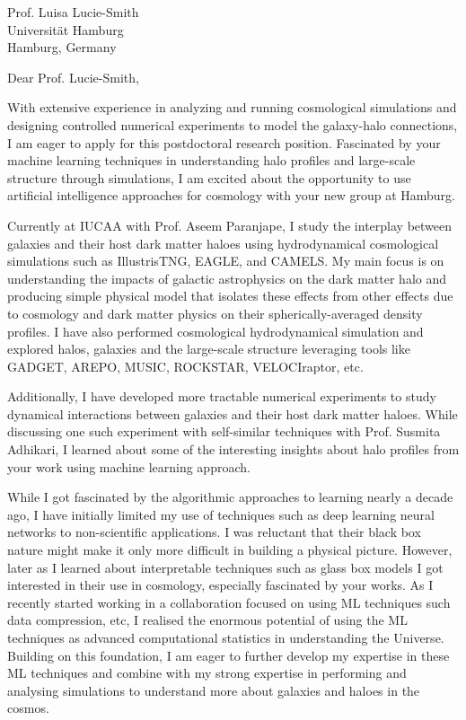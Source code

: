 \documentclass[11pt]{letter}
\begin{document}
\begin{letter}{Prof. Luisa Lucie-Smith \\ Universität Hamburg \\ Hamburg, Germany}

\opening{Dear Prof. Lucie-Smith,}

With extensive experience in analyzing and running cosmological simulations and designing controlled numerical experiments to model the galaxy-halo connections, I am eager to apply for this postdoctoral research position. 
Fascinated by your machine learning techniques in understanding halo profiles and large-scale structure through simulations, I am excited about the opportunity to use artificial intelligence approaches for cosmology with your new group at Hamburg.

Currently at IUCAA with Prof. Aseem Paranjape, I study the interplay between galaxies and their host dark matter haloes using hydrodynamical cosmological simulations such as IllustrisTNG, EAGLE, and CAMELS. My main focus is on understanding the impacts of galactic astrophysics on the dark matter halo and producing simple physical model that isolates these effects from other effects due to cosmology and dark matter physics on their spherically-averaged density profiles. I have also performed cosmological hydrodynamical simulation and explored halos, galaxies and the large-scale structure leveraging tools like GADGET, AREPO, MUSIC, ROCKSTAR, VELOCIraptor, etc.

Additionally, I have developed more tractable numerical experiments to study dynamical interactions between galaxies and their host dark matter haloes. While discussing one such experiment with self-similar techniques with Prof. Susmita Adhikari, I learned about some of the interesting insights about halo profiles from your work using machine learning approach. 

While I got fascinated by the algorithmic approaches to learning nearly a decade ago, I have initially limited my use of techniques such as deep learning neural networks to non-scientific applications. I was reluctant that their black box nature might make it only more difficult in building a physical picture. However, later as I learned about interpretable techniques such as glass box models I got interested in their use in cosmology, especially fascinated by your works. As I recently started working in a collaboration focused on using ML techniques such data compression, etc, I realised the enormous potential of using the ML techniques as advanced computational statistics in understanding the Universe. Building on this foundation, I am eager to further develop my expertise in these ML techniques and combine with my strong expertise in performing and analysing simulations to understand more about galaxies and haloes in the cosmos.


\end{letter}
\end{document}
